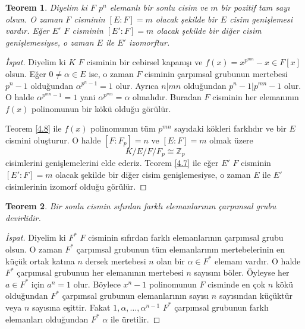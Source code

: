 \documentclass{article}
\newtheorem{thm}{Teorem}[section]
\theoremstyle{definition}
\theoremstyle{remark}
\begin{document}
    	    \begin{thm}\label{4.9}
    	        Diyelim ki $F$ $p^n$ elemanlı bir sonlu cisim ve $m$ bir pozitif tam sayı olsun. O zaman $F$ cisminin $[E : F] = m$ olacak şekilde bir $E$ cisim genişlemesi vardır. Eğer $E'$ $F$ cisminin $[E' : F] = m$ olacak şekilde bir diğer cisim genişlemesiyse, o zaman $E$ ile $E'$ izomorftur.
    	    \end{thm}
    	    
    	    \begin{proof}[İspat]
    	        Diyelim ki $K$ $F$ cisminin bir cebirsel kapanışı ve $f(x) = x^{p^{mn}} - x \in F[x]$ olsun. Eğer $0 \neq \alpha \in E$ ise, o zaman $F$ cisminin çarpımsal grubunun mertebesi $p^n - 1$ olduğundan $\alpha^{p^n - 1} = 1$ olur. Ayrıca $n | mn$ olduğundan $p^n - 1 | p^{mn} - 1$ olur. O halde $\alpha^{p^{mn} - 1} = 1$ yani $\alpha^{p^{mn}} = \alpha$ olmalıdır. Buradan $F$ cisminin her elemanının $f(x)$ polinomunun bir kökü olduğu görülür.\par
    	        Teorem \ref{4.8} ile $f(x)$ polinomunun tüm $p^{mn}$ sayıdaki kökleri farklıdır ve bir $E$ cismini oluşturur. O halde $[F : F_p] = n$ ve $[E : F] = m$ olmak üzere
    	        \begin{equation*}
    	            K / E / F / F_p \cong \mathbb{Z}_p
    	        \end{equation*}
    	        cisimlerini genişlemelerini elde ederiz. Teorem \ref{4.7} ile eğer $E'$ $F$ cisminin $[E' : F] = m$ olacak şekilde bir diğer cisim genişlemesiyse, o zaman $E$ ile $E'$ cisimlerinin izomorf olduğu görülür.
    	    \end{proof}
    	    
    	    \begin{thm}
    	        Bir sonlu cismin sıfırdan farklı elemanlarının çarpımsal grubu devirlidir.
    	    \end{thm}
    	    
    	    \begin{proof}[İspat]
    	        Diyelim ki $F^*$ $F$ cisminin sıfırdan farklı elemanlarının çarpımsal grubu olsun. O zaman $F^*$ çarpımsal grubunun tüm elemanlarının mertebelerinin en küçük ortak katına $n$ dersek mertebesi $n$ olan bir $\alpha \in F^*$ elemanı vardır. O halde $F^*$ çarpımsal grubunun her elemanının mertebesi $n$ sayısını böler. Öyleyse her $a \in F^*$ için $a^n = 1$ olur. Böylece $x^n - 1$ polinomunun $F$ cisminde en çok $n$ kökü olduğundan $F^*$ çarpımsal grubunun elemanlarının sayısı $n$ sayısından küçüktür veya $n$ sayısına eşittir. Fakat $1, \alpha, \dots, \alpha^{n - 1}$ $F^*$ çarpımsal grubunun farklı elemanları olduğundan $F^*$ $\alpha$ ile üretilir.
    	    \end{proof}
    	    
\end{document}
